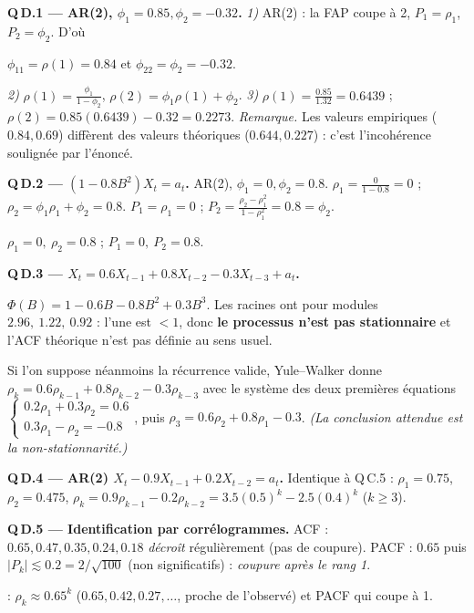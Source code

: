 \documentclass[11pt]{article}
\begin{document}
\textbf{Q\,D.1 --- AR(2), $\phi_1=0.85,\phi_2=-0.32$.}
\emph{1)} AR(2) : la FAP coupe à 2, $P_1=\rho_1$, $P_2=\phi_2$. D'où
\begin{reponse}$\phi_{11}=\rho(1)=0.84$ et $\phi_{22}=\phi_2=-0.32$.\end{reponse}
\emph{2)} $\rho(1)=\frac{\phi_1}{1-\phi_2}$, $\rho(2)=\phi_1\rho(1)+\phi_2$.
\emph{3)} $\rho(1)=\frac{0.85}{1.32}=0.6439$ ; $\rho(2)=0.85(0.6439)-0.32=0.2273$.
\emph{Remarque.} Les valeurs empiriques ($0.84,0.69$) diffèrent des valeurs théoriques
($0.644,0.227$) : c'est l'incohérence soulignée par l'énoncé.

\textbf{Q\,D.2 --- $(1-0.8B^2)X_t=a_t$.}
AR(2), $\phi_1=0,\phi_2=0.8$. $\rho_1=\frac{0}{1-0.8}=0$ ; $\rho_2=\phi_1\rho_1+\phi_2=0.8$.
$P_1=\rho_1=0$ ; $P_2=\frac{\rho_2-\rho_1^2}{1-\rho_1^2}=0.8=\phi_2$.
\begin{reponse}$\rho_1=0,\ \rho_2=0.8$ ; $P_1=0,\ P_2=0.8$.\end{reponse}

\textbf{Q\,D.3 --- $X_t=0.6X_{t-1}+0.8X_{t-2}-0.3X_{t-3}+a_t$.}
\begin{attention}
$\Phi(B)=1-0.6B-0.8B^2+0.3B^3$. Les racines ont pour modules $2.96,\ 1.22,\ 0.92$ : l'une
est \emph{$<1$}, donc \textbf{le processus n'est pas stationnaire} et l'ACF théorique n'est pas
définie au sens usuel.
\end{attention}
Si l'on suppose néanmoins la récurrence valide, Yule--Walker donne
$\rho_k=0.6\rho_{k-1}+0.8\rho_{k-2}-0.3\rho_{k-3}$ avec le système des deux premières équations
$\begin{cases}0.2\rho_1+0.3\rho_2=0.6\\0.3\rho_1-\rho_2=-0.8\end{cases}$, puis
$\rho_3=0.6\rho_2+0.8\rho_1-0.3$. \emph{(La conclusion attendue est la non-stationnarité.)}

\textbf{Q\,D.4 --- AR(2) $X_t-0.9X_{t-1}+0.2X_{t-2}=a_t$.}
Identique à Q\,C.5 : $\rho_1=0.75$, $\rho_2=0.475$, $\rho_k=0.9\rho_{k-1}-0.2\rho_{k-2}
=3.5(0.5)^k-2.5(0.4)^k$ ($k\ge3$).

\textbf{Q\,D.5 --- Identification par corrélogrammes.}
ACF : $0.65,0.47,0.35,0.24,0.18$ \emph{décroît} régulièrement (pas de coupure). PACF :
$0.65$ puis $|P_k|\lesssim0.2=2/\sqrt{100}$ (non significatifs) : \emph{coupure après le rang 1}.
\begin{reponse} : $\rho_k\approx0.65^k$ ($0.65,0.42,0.27,\dots$, proche de
l'observé) et PACF qui coupe à 1.\end{reponse}
\end{document}

